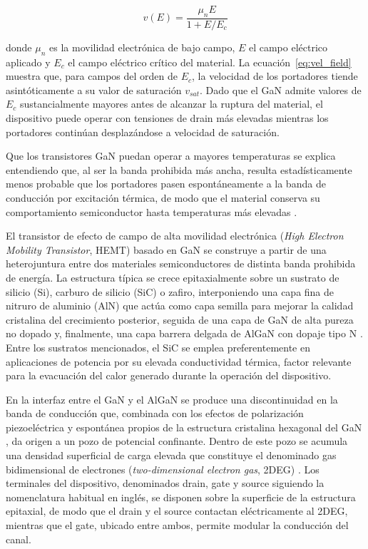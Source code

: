 \begin{equation}
    v(E) = \frac{\mu_n E}{1 + E/E_c}
    \label{eq:vel_field}
\end{equation}

donde $\mu_n$ es la movilidad electrónica de bajo campo, $E$ el campo eléctrico aplicado y $E_c$ el campo eléctrico crítico del material. La ecuación~\eqref{eq:vel_field} muestra que, para campos del orden de $E_c$, la velocidad de los portadores tiende asintóticamente a su valor de saturación $v_{sat}$. Dado que el GaN admite valores de $E_c$ sustancialmente mayores antes de alcanzar la ruptura del material, el dispositivo puede operar con tensiones de drain más elevadas mientras los portadores continúan desplazándose a velocidad de saturación.

Que los transistores GaN puedan operar a mayores temperaturas se explica entendiendo que, al ser la banda prohibida más ancha, resulta estadísticamente menos probable que los portadores pasen espontáneamente a la banda de conducción por excitación térmica, de modo que el material conserva su comportamiento semiconductor hasta temperaturas más elevadas \cite{deblecker2015}.

El transistor de efecto de campo de alta movilidad electrónica (\textit{High Electron Mobility Transistor}, HEMT) basado en GaN se construye a partir de una heterojuntura entre dos materiales semiconductores de distinta banda prohibida de energía. La estructura típica se crece epitaxialmente sobre un sustrato de silicio (Si), carburo de silicio (SiC) o zafiro, interponiendo una capa fina de nitruro de aluminio (AlN) que actúa como capa semilla para mejorar la calidad cristalina del crecimiento posterior, seguida de una capa de GaN de alta pureza no dopado y, finalmente, una capa barrera delgada de AlGaN con dopaje tipo N \cite{marini2013}. Entre los sustratos mencionados, el SiC se emplea preferentemente en aplicaciones de potencia por su elevada conductividad térmica, factor relevante para la evacuación del calor generado durante la operación del dispositivo.

En la interfaz entre el GaN y el AlGaN se produce una discontinuidad en la banda de conducción que, combinada con los efectos de polarización piezoeléctrica y espontánea propios de la estructura cristalina hexagonal del GaN \cite{ambacher2000}, da origen a un pozo de potencial confinante. Dentro de este pozo se acumula una densidad superficial de carga elevada que constituye el denominado gas bidimensional de electrones (\textit{two-dimensional electron gas}, 2DEG) \cite{mishra2008}. Los terminales del dispositivo, denominados drain, gate y source siguiendo la nomenclatura habitual en inglés, se disponen sobre la superficie de la estructura epitaxial, de modo que el drain y el source contactan eléctricamente al 2DEG, mientras que el gate, ubicado entre ambos, permite modular la conducción del canal.

